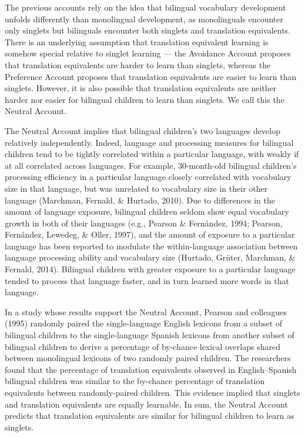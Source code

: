 \documentclass[
  english,
  ,man,floatsintext]{apa6}
\begin{document}
The previous accounts rely on the idea that bilingual vocabulary development unfolds differently than monolingual development, as monolinguals encounter only singlets but bilinguals encounter both singlets and translation equivalents. There is an underlying assumption that translation equivalent learning is somehow special relative to singlet learning --- the Avoidance Account proposes that translation equivalents are harder to learn than singlets, whereas the Preference Account proposes that translation equivalents are easier to learn than singlets. However, it is also possible that translation equivalents are neither harder nor easier for bilingual children to learn than singlets. We call this the Neutral Account.

The Neutral Account implies that bilingual children's two languages develop relatively independently. Indeed, language and processing measures for bilingual children tend to be tightly correlated within a particular language, with weakly if at all correlated across languages. For example, 30-month-old bilingual children's processing efficiency in a particular language closely correlated with vocabulary size in that language, but was unrelated to vocabulary size in their other language (Marchman, Fernald, \& Hurtado, 2010). Due to differences in the amount of language exposure, bilingual children seldom show equal vocabulary growth in both of their languages (e.g., Pearson \& Fernández, 1994; Pearson, Fernández, Lewedeg, \& Oller, 1997), and the amount of exposure to a particular language has been reported to modulate the within-language association between language processing ability and vocabulary size (Hurtado, Grüter, Marchman, \& Fernald, 2014). Bilingual children with greater exposure to a particular language tended to process that language faster, and in turn learned more words in that language.

In a study whose results support the Neutral Account, Pearson and colleagues (1995) randomly paired the single-language English lexicons from a subset of bilingual children to the single-language Spanish lexicons from another subset of bilingual children to derive a percentage of by-chance lexical overlaps shared between monolingual lexicons of two randomly paired children. The researchers found that the percentage of translation equivalents observed in English--Spanish bilingual children was similar to the by-chance percentage of translation equivalents between randomly-paired children. This evidence implied that singlets and translation equivalents are equally learnable. In sum, the Neutral Account predicts that translation equivalents are similar for bilingual children to learn as singlets.
\end{document}
